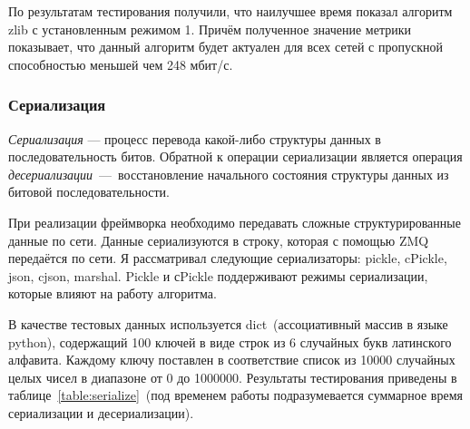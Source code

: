 \documentclass[12pt,a4paper,oneside]{extarticle}
\begin{document}
            По результатам тестирования получили, что наилучшее время показал алгоритм zlib с установленным режимом 1. Причём полученное значение метрики показывает, что данный алгоритм будет актуален для всех сетей с пропускной способностью меньшей чем 248 мбит/с.




        \subsubsection{Сериализация}
            {\it Сериализация} — процесс перевода какой-либо структуры данных в последовательность битов. Обратной к операции сериализации является операция {\it десериализации}~---~восстановление начального состояния структуры данных из битовой последовательности.

            При реализации фреймворка необходимо передавать сложные структурированные данные по сети. Данные сериализуются в строку, которая с помощью ZMQ передаётся по сети. Я рассматривал следующие сериализаторы: pickle, cPickle, json, cjson, marshal. Pickle и сPickle поддерживают режимы сериализации, которые влияют на работу алгоритма.

            В качестве тестовых данных используется dict~(ассоциативный массив в языке python), содержащий 100 ключей в виде строк из 6 случайных букв латинского алфавита. Каждому ключу поставлен в соответствие список из 10000 случайных целых чисел в диапазоне от 0 до 1000000. Результаты тестирования приведены в таблице~\ref{table:serialize}~(под временем работы подразумевается суммарное время сериализации и десериализации).
\end{document}
